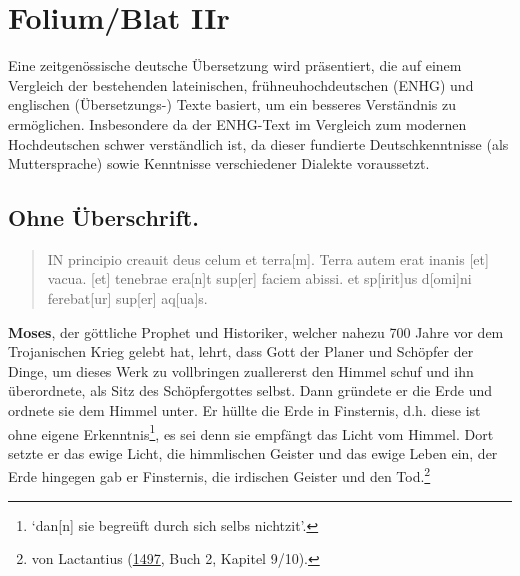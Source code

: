 \documentclass[
]{article}
\author{Dietmar Gerald Schrausser}
\date{09.05.2026}
\begin{document}
\hypertarget{foliumblat-iir}{%
\section{Folium/Blat IIr}\label{foliumblat-iir}}

Eine zeitgenössische deutsche Übersetzung wird präsentiert, die auf
einem Vergleich der bestehenden lateinischen, frühneuhochdeutschen
(ENHG) und englischen (Übersetzungs-) Texte basiert, um ein besseres
Verständnis zu ermöglichen. Insbesondere da der ENHG-Text im Vergleich
zum modernen Hochdeutschen schwer verständlich ist, da dieser fundierte
Deutschkenntnisse (als Muttersprache) sowie Kenntnisse verschiedener
Dialekte voraussetzt.

\hypertarget{ohne-uxfcberschrift.}{%
\subsection{Ohne Überschrift.}\label{ohne-uxfcberschrift.}}

\begin{quote}
IN principio creauit deus celum et terra{[}m{]}. Terra autem erat inanis
{[}et{]} vacua. {[}et{]} tenebrae era{[}n{]}t sup{[}er{]} faciem abissi.
et sp{[}irit{]}us d{[}omi{]}ni ferebat{[}ur{]} sup{[}er{]} aq{[}ua{]}s.
\end{quote}

\textbf{Moses}, der göttliche Prophet und Historiker, welcher nahezu 700
Jahre vor dem Trojanischen Krieg gelebt hat, lehrt, dass Gott der Planer
und Schöpfer der Dinge, um dieses Werk zu vollbringen zuallererst den
Himmel schuf und ihn überordnete, als Sitz des Schöpfergottes selbst.
Dann gründete er die Erde und ordnete sie dem Himmel unter. Er hüllte
die Erde in Finsternis, d.h. diese ist ohne eigene
Erkenntnis\footnote{`dan{[}n{]} sie begreüft durch sich selbs nichtzit'.},
es sei denn sie empfängt das Licht vom Himmel. Dort setzte er das ewige
Licht, die himmlischen Geister und das ewige Leben ein, der Erde
hingegen gab er Finsternis, die irdischen Geister und den
Tod.\footnote{von Lactantius
  (\href{https://books.google.com/books?id=qGsnghsi3uUC}{1497}, Buch 2,
  Kapitel 9/10).}
\end{document}
